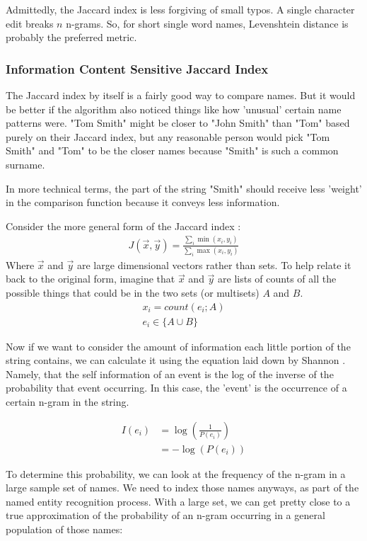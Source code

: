 \documentclass[11pt]{article}
\begin{document}
Admittedly, the Jaccard index is less forgiving of small typos. 
A single character edit breaks $n$ n-grams. So, for short single
word names, Levenshtein distance is probably the preferred metric.

\subsubsection{Information Content Sensitive Jaccard Index}
The Jaccard index by itself is a fairly good way to compare names.
But it would be better if the algorithm also noticed things like
how 'unusual' certain name patterns were. 
"Tom Smith" might be closer to "John Smith" than "Tom" based purely
on their Jaccard index, but any reasonable person would pick
"Tom Smith" and "Tom" to be the closer names because "Smith" is
such a common surname.

In more technical terms, the part of the string "Smith"
should receive less 'weight' in the comparison function because
it conveys less information. 

Consider the more general form of the Jaccard index \cite{general}:
\begin{align*}
J(\vec{x},\vec{y}) = 
\frac{\sum_i \min(x_i, y_i)}{\sum_i \max(x_i, y_i)}
\end{align*}
Where $\vec{x}$ and $\vec{y}$ are large dimensional vectors rather 
than sets. To help relate it back to the original form, 
imagine that $\vec{x}$ and $\vec{y}$ are lists
of counts of all the possible things that could be in the two sets
(or multisets) $A$ and $B$.
\begin{align*}
x_i = count(e_i; A)\\
e_i \in \{A \cup B \}
\end{align*}

Now if we want to consider the amount of information each little
portion of the string contains, we can calculate it
using the equation laid down by Shannon \cite{shannon}.
Namely, that the self information of an event is the log of the
inverse of the probability that event occurring. In this case,
the 'event' is the occurrence of a certain n-gram in the string.

\begin{align*}
I(e_i) &= \log\left(\frac{1}{P(e_i)}\right)\\
&= -\log(P(e_i))
\end{align*}

To determine this probability, we can look at the frequency
of the n-gram in a large sample set of names.
We need to index those names anyways, as part of the named entity
recognition process. With a large set, we can get pretty close to a true 
approximation of the probability of an n-gram occurring in 
a general population of those names:
\end{document}
